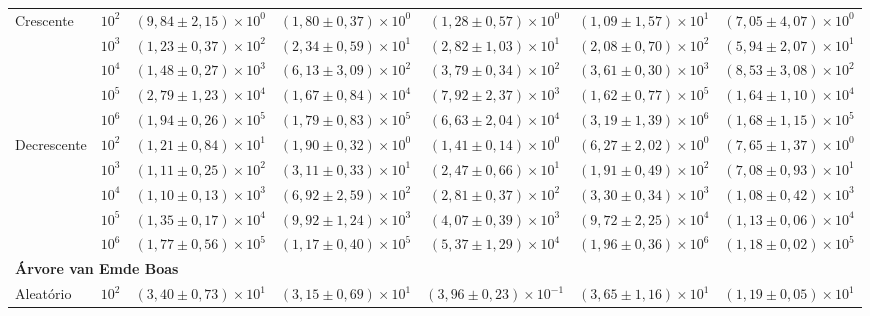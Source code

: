 \documentclass[12pt,a4paper]{report}
\begin{document}
\begin{table}[htbp]
\begin{tabular}{llccccc}
    \cmidrule{2-7}
    \multirow{5}{*}{Crescente} & $10^{2}$ & $(9,84 \pm 2,15) \times 10^{0}$ & $(1,80 \pm 0,37) \times 10^{0}$ & $(1,28 \pm 0,57) \times 10^{0}$ & $(1,09 \pm 1,57) \times 10^{1}$ & $(7,05 \pm 4,07) \times 10^{0}$ \\
     & $10^{3}$ & $(1,23 \pm 0,37) \times 10^{2}$ & $(2,34 \pm 0,59) \times 10^{1}$ & $(2,82 \pm 1,03) \times 10^{1}$ & $(2,08 \pm 0,70) \times 10^{2}$ & $(5,94 \pm 2,07) \times 10^{1}$ \\
     & $10^{4}$ & $(1,48 \pm 0,27) \times 10^{3}$ & $(6,13 \pm 3,09) \times 10^{2}$ & $(3,79 \pm 0,34) \times 10^{2}$ & $(3,61 \pm 0,30) \times 10^{3}$ & $(8,53 \pm 3,08) \times 10^{2}$ \\
     & $10^{5}$ & $(2,79 \pm 1,23) \times 10^{4}$ & $(1,67 \pm 0,84) \times 10^{4}$ & $(7,92 \pm 2,37) \times 10^{3}$ & $(1,62 \pm 0,77) \times 10^{5}$ & $(1,64 \pm 1,10) \times 10^{4}$ \\
     & $10^{6}$ & $(1,94 \pm 0,26) \times 10^{5}$ & $(1,79 \pm 0,83) \times 10^{5}$ & $(6,63 \pm 2,04) \times 10^{4}$ & $(3,19 \pm 1,39) \times 10^{6}$ & $(1,68 \pm 1,15) \times 10^{5}$ \\
    \cmidrule{2-7}
    \multirow{5}{*}{Decrescente} & $10^{2}$ & $(1,21 \pm 0,84) \times 10^{1}$ & $(1,90 \pm 0,32) \times 10^{0}$ & $(1,41 \pm 0,14) \times 10^{0}$ & $(6,27 \pm 2,02) \times 10^{0}$ & $(7,65 \pm 1,37) \times 10^{0}$ \\
     & $10^{3}$ & $(1,11 \pm 0,25) \times 10^{2}$ & $(3,11 \pm 0,33) \times 10^{1}$ & $(2,47 \pm 0,66) \times 10^{1}$ & $(1,91 \pm 0,49) \times 10^{2}$ & $(7,08 \pm 0,93) \times 10^{1}$ \\
     & $10^{4}$ & $(1,10 \pm 0,13) \times 10^{3}$ & $(6,92 \pm 2,59) \times 10^{2}$ & $(2,81 \pm 0,37) \times 10^{2}$ & $(3,30 \pm 0,34) \times 10^{3}$ & $(1,08 \pm 0,42) \times 10^{3}$ \\
     & $10^{5}$ & $(1,35 \pm 0,17) \times 10^{4}$ & $(9,92 \pm 1,24) \times 10^{3}$ & $(4,07 \pm 0,39) \times 10^{3}$ & $(9,72 \pm 2,25) \times 10^{4}$ & $(1,13 \pm 0,06) \times 10^{4}$ \\
     & $10^{6}$ & $(1,77 \pm 0,56) \times 10^{5}$ & $(1,17 \pm 0,40) \times 10^{5}$ & $(5,37 \pm 1,29) \times 10^{4}$ & $(1,96 \pm 0,36) \times 10^{6}$ & $(1,18 \pm 0,02) \times 10^{5}$ \\
    \midrule
    \multicolumn{7}{l}{\textbf{Árvore van Emde Boas}} \\
    \midrule
    \multirow{5}{*}{Aleatório} & $10^{2}$ & $(3,40 \pm 0,73) \times 10^{1}$ & $(3,15 \pm 0,69) \times 10^{1}$ & $(3,96 \pm 0,23) \times 10^{-1}$ & $(3,65 \pm 1,16) \times 10^{1}$ & $(1,19 \pm 0,05) \times 10^{1}$ \\

\end{tabular}
\end{table}
\end{document}
